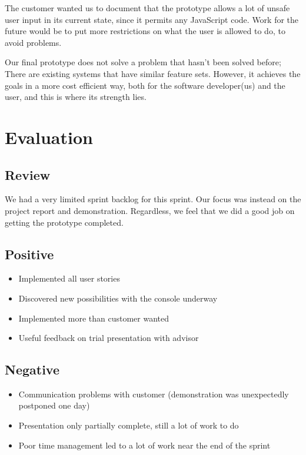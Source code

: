 The customer wanted us to document that the prototype allows a lot of unsafe user input in its current state, since it permits any JavaScript code. Work for the future would be to put more restrictions on what the user is allowed to do, to avoid problems.

Our final prototype does not solve a problem that hasn't been solved before; There are existing systems that have similar feature sets. However, it achieves the goals in a more cost efficient way, both for the software developer(us) and the user, and this is where its strength lies.

\section{Evaluation}
\subsection{Review}
We had a very limited sprint backlog for this sprint. Our focus was instead on the project report and demonstration. Regardless, we feel that we did a good job on getting the prototype completed. 
\subsection{Positive}
\begin{itemize}
 \item Implemented all user stories
 \item Discovered new possibilities with the console underway
 \item Implemented more than customer wanted
 \item Useful feedback on trial presentation with advisor
\end{itemize}
\subsection{Negative}
\begin{itemize}
 \item Communication problems with customer (demonstration was unexpectedly postponed one day)
 \item Presentation only partially complete, still a lot of work to do
 \item Poor time management led to a lot of work near the end of the sprint
\end{itemize}